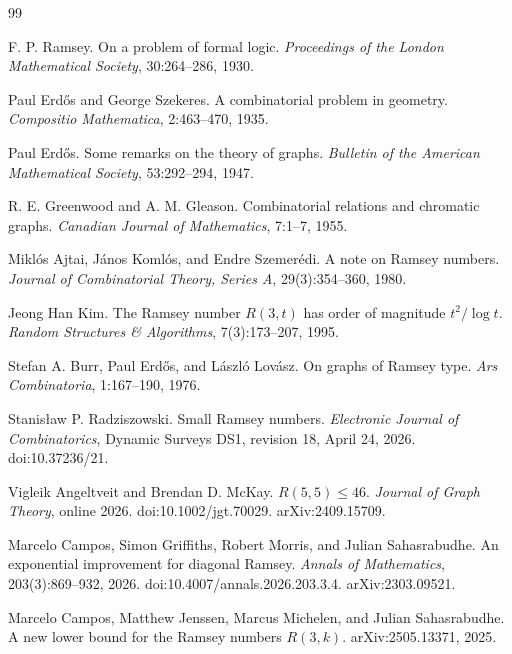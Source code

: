 \documentclass[11pt]{article}
\theoremstyle{plain}
\theoremstyle{definition}
\theoremstyle{remark}
\begin{document}
\begin{thebibliography}{99}

F. P. Ramsey.
\newblock On a problem of formal logic.
\newblock \emph{Proceedings of the London Mathematical Society}, 30:264--286,
1930.

Paul Erd\H{o}s and George Szekeres.
\newblock A combinatorial problem in geometry.
\newblock \emph{Compositio Mathematica}, 2:463--470, 1935.

Paul Erd\H{o}s.
\newblock Some remarks on the theory of graphs.
\newblock \emph{Bulletin of the American Mathematical Society}, 53:292--294,
1947.

R. E. Greenwood and A. M. Gleason.
\newblock Combinatorial relations and chromatic graphs.
\newblock \emph{Canadian Journal of Mathematics}, 7:1--7, 1955.

Mikl\'os Ajtai, J\'anos Koml\'os, and Endre Szemer\'edi.
\newblock A note on Ramsey numbers.
\newblock \emph{Journal of Combinatorial Theory, Series A}, 29(3):354--360,
1980.

Jeong Han Kim.
\newblock The Ramsey number $R(3,t)$ has order of magnitude $t^2/\log t$.
\newblock \emph{Random Structures \& Algorithms}, 7(3):173--207, 1995.

Stefan A. Burr, Paul Erd\H{o}s, and L\'aszl\'o Lov\'asz.
\newblock On graphs of Ramsey type.
\newblock \emph{Ars Combinatoria}, 1:167--190, 1976.

Stanis{\l}aw P. Radziszowski.
\newblock Small Ramsey numbers.
\newblock \emph{Electronic Journal of Combinatorics}, Dynamic Surveys DS1,
revision 18, April 24, 2026.
\newblock doi:10.37236/21.

Vigleik Angeltveit and Brendan D. McKay.
\newblock $R(5,5)\le 46$.
\newblock \emph{Journal of Graph Theory}, online 2026.
\newblock doi:10.1002/jgt.70029.  arXiv:2409.15709.

Marcelo Campos, Simon Griffiths, Robert Morris, and Julian Sahasrabudhe.
\newblock An exponential improvement for diagonal Ramsey.
\newblock \emph{Annals of Mathematics}, 203(3):869--932, 2026.
\newblock doi:10.4007/annals.2026.203.3.4.  arXiv:2303.09521.

Marcelo Campos, Matthew Jenssen, Marcus Michelen, and Julian Sahasrabudhe.
\newblock A new lower bound for the Ramsey numbers $R(3,k)$.
\newblock arXiv:2505.13371, 2025.


\end{thebibliography}
\end{document}
